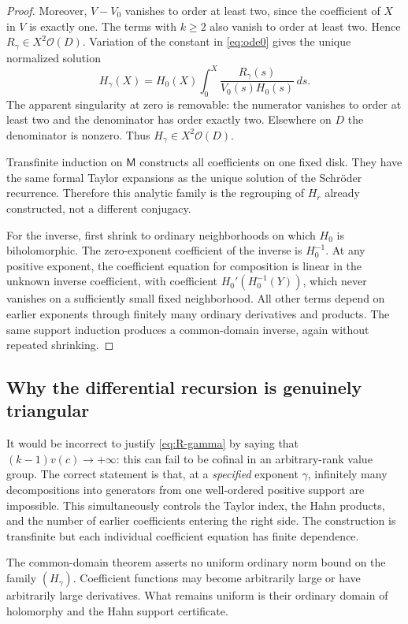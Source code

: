 \documentclass[11pt,letterpaper]{article}
\numberwithin{equation}{section}
\theoremstyle{plain}
\theoremstyle{definition}
\theoremstyle{remark}
\newcommand{\OO}{\mathcal O}
\newcommand{\M}{\mathsf M}
\begin{document}
\begin{proof}
Moreover, $V-V_0$ vanishes to order at least two, since the coefficient of
$X$ in $V$ is exactly one. The terms with $k\ge2$ also vanish to order at
least two. Hence $R_\gamma\in X^2\OO(D)$. Variation of the constant in
\eqref{eq:ode0} gives the unique normalized solution
\begin{equation}\label{eq:gamma-integral}
 H_\gamma(X)=H_0(X)\int_0^X
       \frac{R_\gamma(s)}{V_0(s)H_0(s)}\,ds.
\end{equation}
The apparent singularity at zero is removable: the numerator vanishes to
order at least two and the denominator has order exactly two. Elsewhere on
$D$ the denominator is nonzero. Thus $H_\gamma\in X^2\OO(D)$.

Transfinite induction on $\M$ constructs all coefficients on one fixed disk.
They have the same formal Taylor expansions as the unique solution of the
Schr\"oder recurrence. Therefore this analytic family is the regrouping of
$H_r$ already constructed, not a different conjugacy.

For the inverse, first shrink to ordinary neighborhoods on which $H_0$ is
biholomorphic. The zero-exponent coefficient of the inverse is $H_0^{-1}$.
At any positive exponent, the coefficient equation for composition is linear
in the unknown inverse coefficient, with coefficient
$H_0'(H_0^{-1}(Y))$, which never vanishes on a sufficiently small fixed
neighborhood. All other terms depend on earlier exponents through finitely
many ordinary derivatives and products. The same support induction produces
a common-domain inverse, again without repeated shrinking.
\end{proof}

\subsection{Why the differential recursion is genuinely triangular}

It would be incorrect to justify \eqref{eq:R-gamma} by saying that
$(k-1)v(c)\to+\infty$: this can fail to be cofinal in an arbitrary-rank
value group. The correct statement is that, at a \emph{specified} exponent
$\gamma$, infinitely many decompositions into generators from one
well-ordered positive support are impossible. This simultaneously controls
the Taylor index, the Hahn products, and the number of earlier coefficients
entering the right side. The construction is transfinite but each individual
coefficient equation has finite dependence.

The common-domain theorem asserts no uniform ordinary norm bound on the
family $(H_\gamma)$. Coefficient functions may become arbitrarily large or
have arbitrarily large derivatives. What remains uniform is their ordinary
domain of holomorphy and the Hahn support certificate.
\end{document}
